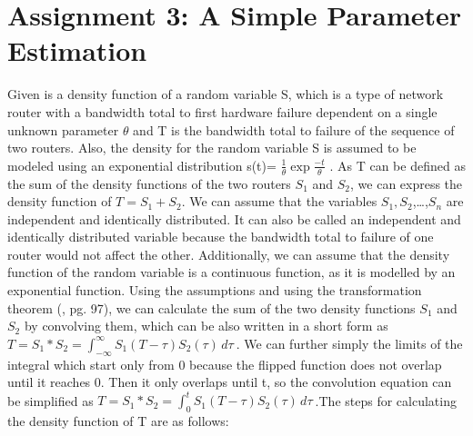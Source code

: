 \chapter{Assignment 3: A Simple Parameter Estimation}

Given is a density function of a random variable S, which is a type of network router with a bandwidth total to first hardware failure dependent on a single unknown parameter $\theta$ and T is the bandwidth total to failure of the sequence of two routers. Also, the density for the random variable S is assumed to be modeled using an exponential distribution s(t)=  $\frac{1}{\theta} \exp{\frac{-t}{\theta}}$ . As T can be defined as the sum of the density functions of the two routers $S_1$  and $S_2$, we can express the density function of  $T= S_1+S_2$.\newline \newline 
We can assume that the variables $S_1,S_2$,…,$S_n$ are independent and identically distributed. It can also be called an independent and identically distributed variable because the bandwidth total to failure of one router would not affect the other. Additionally, we can assume that the density function of the random variable is a continuous function, as it is modelled by an exponential function.\newline \newline
Using the assumptions and using the transformation theorem (\cite{Iubh:2021}, pg. 97), we can calculate the sum of the two density functions $S_1$  and $S_2$ by convolving them, which can be also written in a short form as $T=S_1*S_2= \int_{-\infty}^{\infty} S_1(T-\tau) S_2(\tau) \,d\tau\ $.\newline\newline
We can further simply the limits of the integral which start only from 0 because the flipped function does not overlap until it reaches 0. Then it only overlaps until t, so the convolution equation can be simplified as $T=S_1*S_2= \int_{0}^{t} S_1(T-\tau) S_2(\tau)\,d\tau\ $.The steps for calculating the density function of T are as follows:

